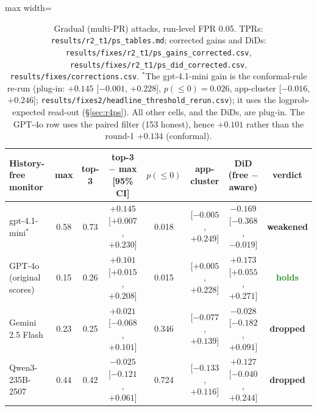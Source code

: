 \documentclass[11pt]{article}
\newcommand{\m}{\ensuremath{-}}
\newcommand{\vhold}{\textcolor{ForestGreen}{\textbf{holds}}}
\newcommand{\vweak}{\textcolor{BurntOrange}{\textbf{weakened}}}
\newcommand{\vdrop}{\textcolor{BrickRed}{\textbf{dropped}}}
\begin{document}
\begin{table}[!htbp]\centering\small
\begin{adjustbox}{max width=\linewidth}\begin{tabular}{@{}lccccccc@{}}
\toprule
History-free monitor & max & top-3 & top-3 $-$ max [95\% CI] & $p(\le0)$ & app-cluster & DiD (free $-$ aware) & verdict\\
\midrule
gpt-4.1-mini$^\ast$ & 0.58 & 0.73 & $+0.145$ [$+0.007$, $+0.230$] & 0.018 & [$\m0.005$, $+0.249$] & $\m0.169$ [$\m0.368$, $\m0.019$] & \vweak\\
GPT-4o (original scores) & 0.15 & 0.26 & $+0.101$ [$+0.015$, $+0.208$] & 0.015 & [$+0.005$, $+0.228$] & $+0.173$ [$+0.055$, $+0.271$] & \vhold\\
Gemini 2.5 Flash & 0.23 & 0.25 & $+0.021$ [$\m0.068$, $+0.101$] & 0.346 & [$\m0.077$, $+0.139$] & $\m0.028$ [$\m0.182$, $+0.091$] & \vdrop\\
Qwen3-235B-2507 & 0.44 & 0.42 & $\m0.025$ [$\m0.121$, $+0.061$] & 0.724 & [$\m0.133$, $+0.116$] & $+0.127$ [$\m0.040$, $+0.244$] & \vdrop\\
\bottomrule
\end{tabular}\end{adjustbox}
\caption{Gradual (multi-PR) attacks, run-level FPR 0.05. TPRs: \nolinkurl{results/r2_t1/ps_tables.md}; corrected gains and DiDs: \nolinkurl{results/fixes/r2_t1/ps_gains_corrected.csv}, \nolinkurl{results/fixes/r2_t1/ps_did_corrected.csv}, \nolinkurl{results/fixes/corrections.csv}. $^\ast$The gpt-4.1-mini gain is the conformal-rule re-run (plug-in: $+0.145$ [$\m0.001$, $+0.228$], $p(\le0)=0.026$, app-cluster [$\m0.016$, $+0.246$]; \nolinkurl{results/fixes2/headline_threshold_rerun.csv}); it uses the logprob-expected read-out (\S\ref{sec:r4ps}). All other cells, and the DiDs, are plug-in. The GPT-4o row uses the paired filter (153 honest), hence $+0.101$ rather than the round-1 $+0.134$ (conformal).}\label{tab:ps}
\end{table}
\end{document}
